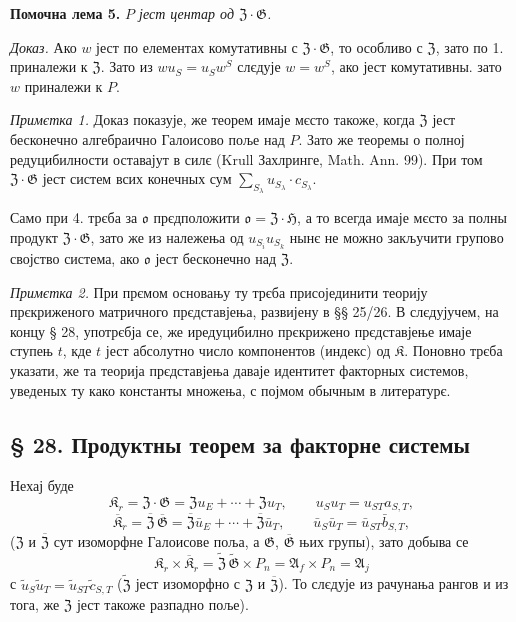 \documentclass[11pt]{article}
\begin{document}
\noindent\textbf{Помочна лема 5.} \emph{\(P\) јест центар од \(\mathfrak Z\cdot\mathfrak G\).}

\noindent\emph{Доказ.} Ако \(w\) јест по елементах комутативны с \(\mathfrak Z\cdot\mathfrak G\), то особливо с \(\mathfrak Z\), зато по 1. приналежи к \(\mathfrak Z\). Зато из \(wu_S=u_Sw^S\) слєдује \(w=w^S\), ако јест комутативны. зато \(w\) приналежи к \(P\).

\noindent\emph{Примєтка 1.} Доказ показује, же теорем имаје мєсто такоже, когда \(\mathfrak Z\) јест бесконечно алгебраично Галоисово поље над \(P\). Зато же теоремы о полној редуцибилности оставајут в силє (Krull Захлринге, Math. Ann. 99). При том \(\mathfrak Z\cdot\mathfrak G\) јест систем всих конечных сум \(\sum_{S_\lambda}u_{S_\lambda}\cdot c_{S_\lambda}\).

Само при 4. трєба за \(\mathfrak o\) прєдположити \(\mathfrak o=\mathfrak Z\cdot\mathfrak H\), а то всегда имаје мєсто за полны продукт \(\mathfrak Z\cdot\mathfrak G\), зато же из належења од \(u_{S_i}u_{S_k}\) нынє не можно закључити групово својство система, ако \(\mathfrak o\) јест бесконечно над \(\mathfrak Z\).

\noindent\emph{Примєтка 2.} При прємом основању ту трєба присојединити теорију прєкриженого матричного прєдставјења, развијену в §§ 25/26. В слєдујучем, на концу § 28, употрєбја се, же иредуцибилно прєкрижено прєдставјење имаје ступењ \(t\), кде \(t\) јест абсолутно число компонентов (индекс) од \(\mathfrak K\). Поновно трєба указати, же та теорија прєдставјења даваје идентитет факторных системов, уведеных ту како константы множења, с појмом обычным в литературє.

\subsection*{§ 28. Продуктны теорем за факторне системы}\label{produktsatz-fuer-faktorensysteme}

Нехај буде
\[
\mathfrak K_r=\mathfrak Z\cdot\mathfrak G
=\mathfrak Zu_E+\cdots+\mathfrak Zu_T,
\qquad u_Su_T=u_{ST}a_{S,T},
\]
\[
\overline{\mathfrak K}_r
=\overline{\mathfrak Z}\,\overline{\mathfrak G}
=\overline{\mathfrak Z}\bar u_E+\cdots+\overline{\mathfrak Z}\bar u_T,
\qquad
\bar u_S\bar u_T=\bar u_{ST}\bar b_{S,T},
\]
(\(\mathfrak Z\) и \(\overline{\mathfrak Z}\) сут изоморфне Галоисове поља, а \(\mathfrak G\), \(\overline{\mathfrak G}\) њих групы), зато добыва се
\[
\mathfrak K_r\times\overline{\mathfrak K}_r
=\widetilde{\mathfrak Z}\,\widetilde{\mathfrak G}\times P_n
=\mathfrak A_f\times P_n
=\mathfrak A_j
\]
с \(\tilde u_S\tilde u_T=\tilde u_{ST}\tilde c_{S,T}\) (\(\widetilde{\mathfrak Z}\) јест изоморфно с \(\mathfrak Z\) и \(\overline{\mathfrak Z}\)). То слєдује из рачунања рангов и из тога, же \(\mathfrak Z\) јест такоже разпадно поље).
\end{document}
